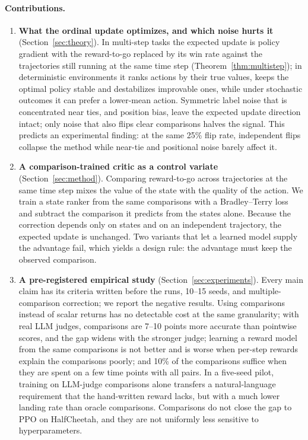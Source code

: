 \documentclass[11pt]{article}
\theoremstyle{remark}
\begin{document}
\paragraph{Contributions.}
\begin{enumerate}
\item \textbf{What the ordinal update optimizes, and which noise hurts it} (Section~\ref{sec:theory}). In multi-step tasks the expected update is policy gradient with the reward-to-go replaced by its win rate against the trajectories still running at the same time step (Theorem~\ref{thm:multistep}); in deterministic environments it ranks actions by their true values, keeps the optimal policy stable and destabilizes improvable ones, while under stochastic outcomes it can prefer a lower-mean action. Symmetric label noise that is concentrated near ties, and position bias, leave the expected update direction intact; only noise that also flips clear comparisons halves the signal. This predicts an experimental finding: at the same 25\% flip rate, independent flips collapse the method while near-tie and positional noise barely affect it.
\item \textbf{A comparison-trained critic as a control variate} (Section~\ref{sec:method}). Comparing reward-to-go across trajectories at the same time step mixes the value of the state with the quality of the action. We train a state ranker from the same comparisons with a Bradley--Terry loss and subtract the comparison it predicts from the states alone. Because the correction depends only on states and on an independent trajectory, the expected update is unchanged. Two variants that let a learned model supply the advantage fail, which yields a design rule: the advantage must keep the observed comparison.
\item \textbf{A pre-registered empirical study} (Section~\ref{sec:experiments}). Every main claim has its criteria written before the runs, 10--15 seeds, and multiple-comparison correction; we report the negative results. Using comparisons instead of scalar returns has no detectable cost at the same granularity; with real LLM judges, comparisons are 7--10 points more accurate than pointwise scores, and the gap widens with the stronger judge; learning a reward model from the same comparisons is not better and is worse when per-step rewards explain the comparisons poorly; and 10\% of the comparisons suffice when they are spent on a few time points with all pairs. In a five-seed pilot, training on LLM-judge comparisons alone transfers a natural-language requirement that the hand-written reward lacks, but with a much lower landing rate than oracle comparisons. Comparisons do not close the gap to PPO on HalfCheetah, and they are not uniformly less sensitive to hyperparameters.
\end{enumerate}
\end{document}
